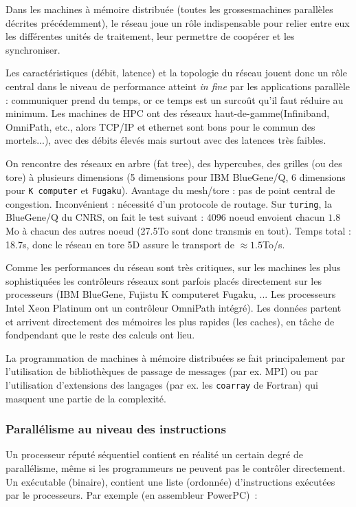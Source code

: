 Dans les machines à mémoire distribuée (toutes les \og grosses\fg machines
parallèles décrites précédemment), le réseau joue un rôle indispensable pour
relier entre eux les différentes unités de traitement, leur permettre de
coopérer et les synchroniser.

Les caractéristiques (débit, latence) et la topologie du réseau jouent donc un
rôle central dans le niveau de performance atteint \textit{in fine} par les
applications parallèle : communiquer prend du temps, or ce temps est un surcoût
qu'il faut réduire au minimum. Les machines de HPC ont des réseaux \og
haut-de-gamme\fg (Infiniband, OmniPath, etc., alors TCP/IP et ethernet sont bons
pour le \og commun des mortels\fg...), avec des débits élevés mais surtout avec
des latences très faibles.

On rencontre des réseaux en arbre (\og fat tree\fg), des hypercubes, des grilles
(ou des tore) à plusieurs dimensions (5 dimensions pour IBM BlueGene/Q, 6
dimensions pour \texttt{K computer} et \texttt{Fugaku}). Avantage du mesh/tore :
pas de point central de congestion. Inconvénient : nécessité d'un protocole de
routage. Sur \texttt{turing}, la BlueGene/Q du CNRS, on fait le test suivant :
4096 noeud envoient chacun $1.8$Mo à chacun des autres noeud (27.5To sont donc
transmis en tout). Temps total : 18.7s, donc le réseau en tore 5D assure le
transport de $\approx 1.5$To/s.

Comme les performances du réseau sont très critiques, sur les machines les plus
sophistiquées les contrôleurs réseaux sont parfois placés directement sur les
processeurs (IBM BlueGene, Fujistu \og K computer\fg et Fugaku, ... Les
processeurs Intel Xeon Platinum ont un contrôleur OmniPath intégré). Les données
partent et arrivent directement des mémoires les plus rapides (les caches), en
\og tâche de fond\fg pendant que le reste des calculs ont lieu.

La programmation de machines à mémoire distribuées se fait principalement par
l'utilisation de bibliothèques de passage de messages (par ex. MPI) ou par
l'utilisation d'extensions des langages (par ex. les \texttt{coarray} de
Fortran) qui masquent une partie de la complexité.

\subsubsection{Parallélisme au niveau des instructions}

Un processeur réputé séquentiel contient en réalité un certain degré de
parallélisme, même si les programmeurs ne peuvent pas le contrôler
directement. Un exécutable (\og binaire\fg), contient une liste (ordonnée)
d'instructions exécutées par le processeurs. Par exemple (en assembleur
PowerPC)~:

